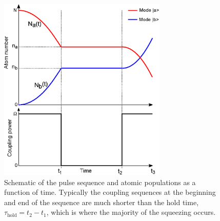 \documentclass{iopart}
\begin{document}
\begin{figure}
    \centering
    \includegraphics[width=8cm]{figures/pulse_scheme.eps}
    \caption{Schematic of the pulse sequence and atomic populations as a function of time.  Typically the coupling sequences at the beginning and end of the sequence are much shorter than the hold time, $\tau_{\mathrm{hold}} = t_2 - t_1 $, which is where the majority of the squeezing occurs.}
    \label{figPulseScheme}
\end{figure}
\end{document}
